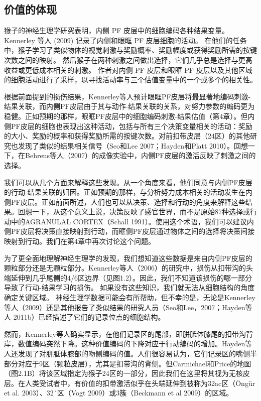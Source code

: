 \subsection{价值的体现}
猴子的神经生理学研究表明，内侧 PF 皮层中的细胞编码各种结果变量。 Kennerley 等人 (2009) 记录了内侧和眼眶 PF 皮层细胞的活动。 在他们的任务中，猴子学习了类似物体的视觉刺激与奖励概率、奖励幅度或获得奖励所需的按键次数之间的映射。 然后猴子在两种刺激之间做出选择，它们几乎总是选择与更高收益或更低成本相关的刺激。 作者对内侧 PF 皮层和眼眶 PF 皮层以及其他区域的细胞活动进行了采样，以寻找活动率与三个估值变量中的一个或多个的相关性。\par
根据前面提到的损伤结果，Kennerley等人预计眼眶PF皮层将最显著地编码刺激-结果关联，而内侧PF皮层由于其与动作-结果关联的关系，对努力参数的编码更为稳健。正如预期的那样，眼眶PF皮层中的细胞编码刺激-结果估值（第4章）。但内侧PF皮层的细胞也表现出这种活动，包括与所有三个决策变量相关的活动：奖励的大小、奖励的概率和获得奖励所需的按键次数。对前扣带皮层（24区）的其他研究也发现了类似的结果相关信号（Seo和Lee 2007；Hayden和Platt 2010）。回想一下，在Behrens等人（2007）的成像实验中，内侧PF皮层的激活反映了刺激之间的选择。\par
我们可以从几个方面来解释这些发现。从一个角度来看，他们同意与内侧PF皮层的行动-结果关联的归因。正如预期的那样，与分析努力成本相关的活动发生在内侧PF皮层。正如前面所述，人们也可以从决策、选择和行动的角度来解释这些结果。回想一下，从这个意义上说，决策反映了感官世界，而不是原始87种选择或行动中的AGRANULAL CORTEX（Schall 1991）。使用这个术语，我们可以建议内侧PF皮层将决策直接映射到行动，而眶侧PF皮层通过物体之间的选择将决策间接映射到行动。我们在第4章中再次讨论这个问题。\par
为了更全面地理解神经生理学的发现，我们想知道这些数据是来自内侧PF皮层的颗粒部分还是无颗粒部分。Kennerley等人（2006）的研究中，损伤从扣带沟的头端延伸到几乎尾侧的4/6区边界（见图1.2）。因此，我们不知道该损伤的哪一部分导致了行动-结果学习的损伤。
如果没有这些知识，我们就无法从细胞结构的角度确定关键区域。
神经生理学数据可能会有所帮助，但不幸的是，无论是Kennerley等人（2009）还是其他报告了类似结果的研究人员（Seo和Lee，2007；Hayden等人
2011b）已经描述了它们的记录位点的细胞结构。\par
然而，Kennerley等人确实显示，在他们记录区的尾部，即胼胝体膝尾的扣带沟背岸，数值编码突然下降。这种价值编码的下降对应于行动编码的增加。Hayden等人还发现了对胼胝体膝部的吻侧编码的值。人们很容易认为，它们记录区的嘴侧半部分对应于9区（颗粒皮层），尤其是扣带沟的背侧。但Carmichael和Price的地图（图2.1B）将该区域指定为猴子24区的一部分，因此我们在这里将其视为无核皮层。在人类受试者中，有价值的扣带激活似乎在头端延伸到被称为32ac区（Öngür et al. 2003）、32´区（Vogt 2009）或3簇（Beckmann et al 2009）的区域。\par
